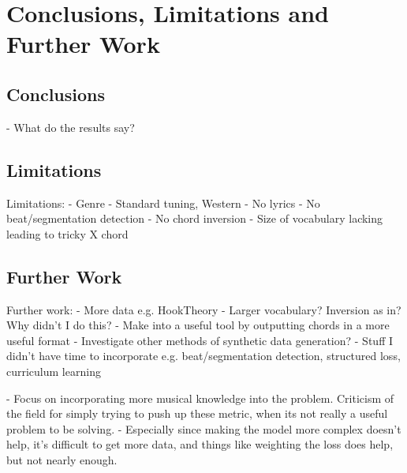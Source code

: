
\chapter{Conclusions, Limitations and Further Work}

\section{Conclusions}

- What do the results say?

\section{Limitations}
Limitations:
- Genre
- Standard tuning, Western
- No lyrics
- No beat/segmentation detection
- No chord inversion
- Size of vocabulary lacking leading to tricky X chord

\section{Further Work}
Further work:
- More data e.g. HookTheory
- Larger vocabulary? Inversion as in? Why didn't I do this?
- Make into a useful tool by outputting chords in a more useful format
- Investigate other methods of synthetic data generation?
- Stuff I didn't have time to incorporate e.g. beat/segmentation detection, structured loss, curriculum learning

- Focus on incorporating more musical knowledge into the problem. Criticism of the field for simply trying to push up these metric, when its not really a useful problem to be solving.
- Especially since making the model more complex doesn't help, it's difficult to get more data, and things like weighting the loss does help, but not nearly enough.